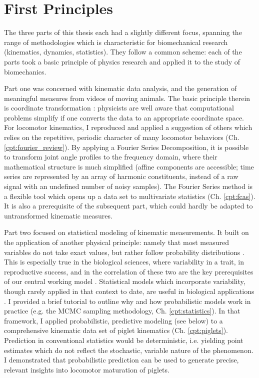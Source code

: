 \section{First Principles}
\label{sec:orgec9488e}
The three parts of this thesis each had a slightly different focus, spanning the range of methodologies which is characteristic for biomechanical research (kinematics, dynamics, statistics).
They follow a common scheme:
each of the parts took a basic principle of physics research and applied it to the study of biomechanics.


Part one was concerned with kinematic data analysis, and the generation of meaningful measures from videos of moving animals.
The basic principle therein is coordinate transformation \citep{Tipler2007}: physicists are well aware that computational problems simplify if one converts the data to an appropriate coordinate space.
For locomotor kinematics, I reproduced and applied a suggestion of others \citep{Bernstein1927a,Webb2007} which relies on the repetitive, periodic character of many locomotor behaviors (Ch. \ref{cpt:fourier_review}).
By applying a Fourier Series Decomposition, it is possible to transform joint angle profiles to the frequency domain, where their mathematical structure is much simplified (affine components are accessible; time series are represented by an array of harmonic constituents, instead of a raw signal with an undefined number of noisy samples).
The Fourier Series method is a flexible tool which opens up a data set to multivariate statistics (Ch. \ref{cpt:fcas}).
It is also a prerequisite of the subsequent part, which could hardly be adapted to untransformed kinematic measures.


Part two focused on statistical modeling of kinematic measurements.
It built on the application of another physical principle: namely that most measured variables do not take exact values, but rather follow probability distributions \citep{2022Probability}.
This is especially true in the biological sciences, where variability in a trait, in reproductive success, and in the correlation of these two are the key prerequisites of our central working model \citep{Darwin1859}.
Statistical models which incorporate variability, though rarely applied in that context to date, are useful in biological applications \citep{Roraas2019,DeGroote2021}.
I provided a brief tutorial to outline why and how probabilistic models work in practice (e.g. the MCMC sampling methodology, Ch. \ref{cpt:statistics}).
In that framework, I applied probabilistic, predictive modeling (see below) to a comprehensive kinematic data set of piglet kinematics (Ch. \ref{cpt:piglets}).
Prediction in conventional statistics would be deterministic, i.e. yielding point estimates which do not reflect the stochastic, variable nature of the phenomenon.
I demonstrated that probabilistic prediction can be used to generate precise, relevant insights into locomotor maturation of piglets.


